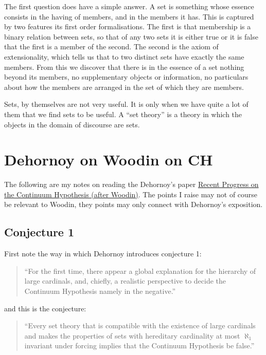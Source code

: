 The first question does have a simple answer.
A set is something whose essence consists in the having of members, and in the members it has.
This is captured by two features its first order formalisations.
The first is that membership is a binary relation between sets, so that of any two sets it is either true or it is false that the first is a member of the second.
The second is the axiom of extensionality, which tells us that to two distinct sets have exactly the same members.
From this we discover that there is in the essence of a set nothing beyond its members, no supplementary objects or information, no particulars about how the members are arranged in the set of which they are members. 

Sets, by themselves are not very useful.
It is only when we have quite a lot of them that we find sets to be useful.
A ``set theory'' is a theory in which the objects in the domain of discourse are sets.

\section{Dehornoy on Woodin on CH}

The following are my notes on reading the Dehornoy's paper \href{http://www.math.unicaen.fr/~dehornoy/Surveys/DgtUS.pdf}{Recent Progress on the Continuum Hypothesis (after Woodin)}.
The points I raise may not of course be relevant to Woodin, they points may only connect with Dehornoy's exposition.

\subsection{Conjecture 1}

First note the way in which Dehornoy introduces conjecture 1:

\begin{quote}
``For the first time, there appear a global explanation for the hierarchy of large cardinals, and, chiefly, a
realistic perspective to decide the Continuum Hypothesis namely in the negative.''
\end{quote}

and this is the conjecture:

\begin{quote}
``Every set theory that is compatible with the existence of large cardinals
and makes the properties of sets with hereditary cardinality at most $\aleph_1$ invariant under forcing
implies that the Continuum Hypothesis be false.''
\end{quote}


